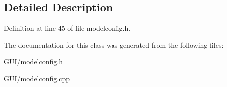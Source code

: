 \subsection{Detailed Description}


Definition at line 45 of file modelconfig.\+h.



The documentation for this class was generated from the following files\+:\begin{DoxyCompactItemize}
\item 
G\+U\+I/modelconfig.\+h\item 
G\+U\+I/modelconfig.\+cpp\end{DoxyCompactItemize}
